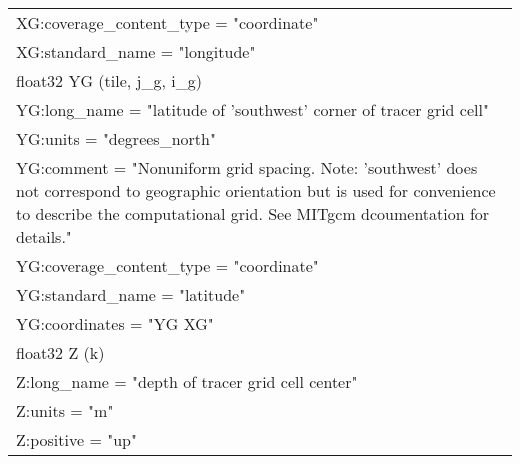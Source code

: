 \begin{longtable}{|p{\textwidth}|}
\rowcolor{Apricot}\hspace{0.5cm}\hspace{0.5cm}XG:coverage\_content\_type = "coordinate"\\
\rowcolor{Apricot}\hspace{0.5cm}\hspace{0.5cm}XG:standard\_name = "longitude"\\
\rowcolor{Apricot}\hspace{0.5cm}float32 YG (tile, j\_g, i\_g)\\
\rowcolor{Apricot}\hspace{0.5cm}\hspace{0.5cm}YG:long\_name = "latitude of 'southwest' corner of tracer grid cell"\\
\rowcolor{Apricot}\hspace{0.5cm}\hspace{0.5cm}YG:units = "degrees\_north"\\
\rowcolor{Apricot}\hspace{0.5cm}\hspace{0.5cm}YG:comment = "Nonuniform grid spacing. Note: 'southwest' does not correspond to geographic orientation but is used for convenience to describe the computational grid. See MITgcm dcoumentation for details."\\
\rowcolor{Apricot}\hspace{0.5cm}\hspace{0.5cm}YG:coverage\_content\_type = "coordinate"\\
\rowcolor{Apricot}\hspace{0.5cm}\hspace{0.5cm}YG:standard\_name = "latitude"\\
\rowcolor{Apricot}\hspace{0.5cm}\hspace{0.5cm}YG:coordinates = "YG XG"\\
\rowcolor{Apricot}\hspace{0.5cm}float32 Z (k)\\
\rowcolor{Apricot}\hspace{0.5cm}\hspace{0.5cm}Z:long\_name = "depth of tracer grid cell center"\\
\rowcolor{Apricot}\hspace{0.5cm}\hspace{0.5cm}Z:units = "m"\\
\rowcolor{Apricot}\hspace{0.5cm}\hspace{0.5cm}Z:positive = "up"\\

\end{longtable}
